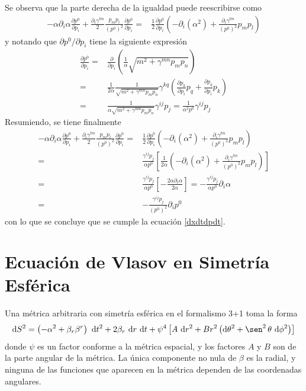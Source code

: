 \documentclass[11pt,twoside,openright,spanish]{report}
\numberwithin{equation}{chapter}
\numberwithin{figure}{chapter}
\numberwithin{table}{chapter}
\renewcommand{\sin}{\operatorname{\sen}}
\begin{document}
Se observa que la parte derecha de la igualdad puede reescribirse como
\begin{align*}
-\alpha\partial_i\alpha\frac{\partial p^0}{\partial p_i}+\frac{\partial_i\gamma^{lm}}{2}\frac{p_mp_l}{\left(p^0\right)^2}\frac{\partial p^0}{\partial p_i}=&\frac{1}{2}\frac{\partial p^0}{\partial p_i}\left(-\partial_i\left(\alpha^2\right)+\frac{\partial_i\gamma^{lm}}{\left(p^0\right)^2}p_mp_l\right)
\end{align*}
y notando que $\partial p^0/\partial p_i$ tiene la siguiente expresión
\begin{align*}
\frac{\partial p^0}{\partial p_i}=&\frac{\partial}{\partial p_i}\left(\frac{1}{\alpha}\sqrt{m^2+\gamma^{mn}p_mp_n}\right)\\
=&\frac{1}{2\alpha}\frac{1}{\sqrt{m^2+\gamma^{mn}p_mp_n}}\gamma^{kq}\left(\frac{\partial p_k}{\partial p_i}p_q+\frac{\partial p_q}{\partial p_i}p_k\right)\\
=&\frac{1}{\alpha\sqrt{m^2+\gamma^{mn}p_mp_n}}\gamma^{ij}p_j=\frac{1}{\alpha^2p^0}\gamma^{ij}p_j
\end{align*}
Resumiendo, se tiene finalmente
\begin{align*}
-\alpha\partial_i\alpha\frac{\partial p^0}{\partial p_i}+\frac{\partial_i\gamma^{lm}}{2}\frac{p_mp_l}{\left(p^0\right)^2}\frac{\partial p^0}{\partial p_i}=&\frac{1}{2}\frac{\partial p^0}{\partial p_i}\left(-\partial_i\left(\alpha^2\right)+\frac{\partial_i\gamma^{lm}}{\left(p^0\right)^2}p_mp_l\right)\\
=&\frac{\gamma^{ij}p_j}{\alpha p^0}\left[\frac{1}{2\alpha}\left(-\partial_i\left(\alpha^2\right)+\frac{\partial_i\gamma^{lm}}{\left(p^0\right)^2}p_mp_l\right)\right]\\
=&\frac{\gamma^{ij}p_j}{\alpha p^0}\left[-\frac{2\alpha\partial_i \alpha}{2\alpha}\right]=-\frac{\gamma^{ij}p_j}{\alpha p^0}\partial_i \alpha\\
=&-\frac{\gamma^{ij}p_j}{\left(p^0 \right)^2}\partial_i p^0
\end{align*}
con lo que se concluye que se cumple la ecuación \eqref{dxdtdpdt}.


\section{Ecuación de Vlasov en Simetría Esférica}
\noindent
Una métrica arbitraria con simetría esférica en el formalismo 3+1 toma la forma
\begin{equation}
\text{d}S^2=\left(-\alpha^2+\beta_r\beta^r\right)\ \text{d}t^2+2\beta_r\ \text{d}r\ \text{d}t+\psi^4\left[A\ \text{d}r^2+Br^2\left(\text{d}\theta^2+\sin^2\theta\ \text{d}\phi^2\right)\right]
\label{metsimesf31}
\end{equation}
donde $\psi$ es un factor conforme a la métrica espacial, y los factores $A$ y $B$ son de la parte angular de la métrica. La única componente no nula de $\beta$ es la radial, y ninguna de las funciones que aparecen en la métrica dependen de las coordenadas angulares.
\end{document}
